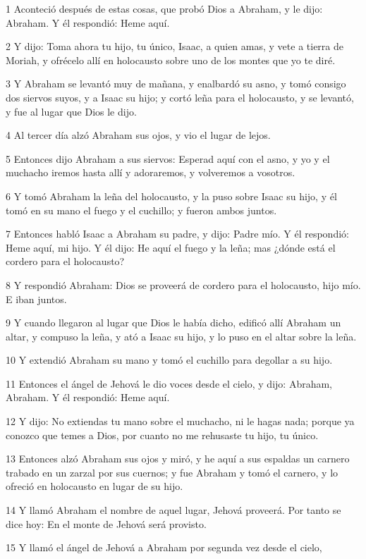\par 1 Aconteció después de estas cosas, que probó Dios a Abraham, y le dijo: Abraham. Y él respondió: Heme aquí.
\par 2 Y dijo: Toma ahora tu hijo, tu único, Isaac, a quien amas, y vete a tierra de Moriah, y ofrécelo allí en holocausto sobre uno de los montes que yo te diré.
\par 3 Y Abraham se levantó muy de mañana, y enalbardó su asno, y tomó consigo dos siervos suyos, y a Isaac su hijo; y cortó leña para el holocausto, y se levantó, y fue al lugar que Dios le dijo.
\par 4 Al tercer día alzó Abraham sus ojos, y vio el lugar de lejos.
\par 5 Entonces dijo Abraham a sus siervos: Esperad aquí con el asno, y yo y el muchacho iremos hasta allí y adoraremos, y volveremos a vosotros.
\par 6 Y tomó Abraham la leña del holocausto, y la puso sobre Isaac su hijo, y él tomó en su mano el fuego y el cuchillo; y fueron ambos juntos.
\par 7 Entonces habló Isaac a Abraham su padre, y dijo: Padre mío. Y él respondió: Heme aquí, mi hijo. Y él dijo: He aquí el fuego y la leña; mas ¿dónde está el cordero para el holocausto?
\par 8 Y respondió Abraham: Dios se proveerá de cordero para el holocausto, hijo mío. E iban juntos.
\par 9 Y cuando llegaron al lugar que Dios le había dicho, edificó allí Abraham un altar, y compuso la leña, y ató a Isaac su hijo, y lo puso en el altar sobre la leña.
\par 10 Y extendió Abraham su mano y tomó el cuchillo para degollar a su hijo.
\par 11 Entonces el ángel de Jehová le dio voces desde el cielo, y dijo: Abraham, Abraham. Y él respondió: Heme aquí.
\par 12 Y dijo: No extiendas tu mano sobre el muchacho, ni le hagas nada; porque ya conozco que temes a Dios, por cuanto no me rehusaste tu hijo, tu único.
\par 13 Entonces alzó Abraham sus ojos y miró, y he aquí a sus espaldas un carnero trabado en un zarzal por sus cuernos; y fue Abraham y tomó el carnero, y lo ofreció en holocausto en lugar de su hijo.
\par 14 Y llamó Abraham el nombre de aquel lugar, Jehová proveerá. Por tanto se dice hoy: En el monte de Jehová será provisto.
\par 15 Y llamó el ángel de Jehová a Abraham por segunda vez desde el cielo,
